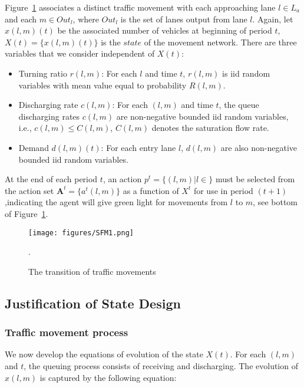 \begin{example}
\label{eg:inter}
Figure~\ref{fig:SFM} associates a distinct traffic movement with each approaching lane $l\in L_a$ and each $m\in Out_l$, where $Out_l$ is the set of lanes output from lane $l$. 
Again, let $x(l,m)(t)$ be the associated number of vehicles at beginning of period $t$, $X(t) = \{x(l,m)(t)\}$ is the $state$ of the movement network. There are three variables that we consider independent of $X(t)$: 
\begin{itemize}
    \item Turning ratio $r(l,m)$: For each $l$ and time $t$, $r(l,m)$ is iid random variables with mean value equal to probability $R(l,m)$. 
    \item Discharging rate $c(l,m)$: For each $(l,m)$ and time $t$, the queue discharging rates $c(l,m)$ are non-negative bounded iid random variables,  i.e., $c(l,m)\leq C(l,m)$, $C(l,m)$ denotes the saturation flow rate.
    \item Demand $d(l,m)(t)$:  For each entry lane $l$, $d(l,m)$ are also non-negative bounded iid random variables. 
\end{itemize}

At the end of each period $t$, an action $p^t=\{(l,m)|l\in \}$ must be selected from the action set $\pmb{A}^t = \{a^t(l,m)\}$ as a function of $X^t$ for use in period $(t+1)$,indicating the agent will give green light for movements from $l$ to $m$, see bottom of Figure~\ref{fig:SFM}. 
\end{example}
\begin{figure}[h!]
\centering
\texttt{[image: figures/SFM1.png]}
\caption{The transition of traffic movements}.
\label{fig:SFM}
\end{figure}


\subsection{Justification of State Design}

\subsubsection{Traffic movement process}
We now develop the equations of evolution of the state $X(t)$. For each $(l,m)$ and $t$, the queuing process consists of receiving and discharging. The evolution of  $x(l,m)$ is captured by the following equation:


